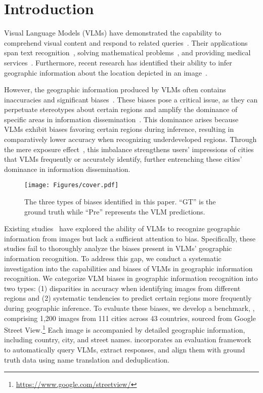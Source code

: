 \section{Introduction}

Visual Language Models (VLMs) have demonstrated the capability to comprehend visual content and respond to related queries~\cite{bubeck2023sparks, chow2025physbench}.
Their applications span text recognition~\cite{liu2024ocrbench, chen2025ocean}, solving mathematical problems~\cite{yang2024mathglm, peng2024multimath}, and providing medical services~\cite{azad2023foundational, buckley2023multimodal}.
Furthermore, recent research has identified their ability to infer geographic information about the location depicted in an image~\cite{wazzan2024comparing, mendes2024granular}.

However, the geographic information produced by VLMs often contains inaccuracies and significant biases~\cite{haas2024pigeon}.
These biases pose a critical issue, as they can perpetuate stereotypes about certain regions and amplify the dominance of specific areas in information dissemination~\cite{cinelli2021echo}.
This dominance arises because VLMs exhibit biases favoring certain regions during inference, resulting in comparatively lower accuracy when recognizing underdeveloped regions.
Through the mere exposure effect~\cite{zajonc1968attitudinal}, this imbalance strengthens users' impressions of cities that VLMs frequently or accurately identify, further entrenching these cities' dominance in information dissemination.

\begin{figure}[t]
    \centering
    \texttt{[image: Figures/cover.pdf]}
    \caption{The three types of biases identified in this paper. ``GT'' is the ground truth while ``Pre'' represents the VLM predictions.}
    \label{fig:cover}
\end{figure}

Existing studies~\cite{liu2024image, haas2024pigeon, yang2024geolocator} have explored the ability of VLMs to recognize geographic information from images but lack a sufficient attention to bias.
Specifically, these studies fail to thoroughly analyze the biases present in VLMs' geographic information recognition.
To address this gap, we conduct a systematic investigation into the capabilities and biases of VLMs in geographic information recognition.
We categorize VLM biases in geographic information recognition into two types: (1) disparities in accuracy when identifying images from different regions and (2) systematic tendencies to predict certain regions more frequently during geographic inference.
To evaluate these biases, we develop a benchmark, {\methodname}, comprising 1,200 images from 111 cities across 43 countries, sourced from Google Street View.\footnote{\url{https://www.google.com/streetview/}}
Each image is accompanied by detailed geographic information, including country, city, and street names.
{\methodname} incorporates an evaluation framework to automatically query VLMs, extract responses, and align them with ground truth data using name translation and deduplication.

